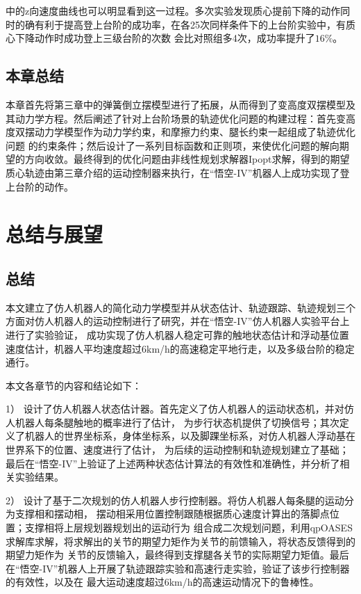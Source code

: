 中的z向速度曲线也可以明显看到这一过程。多次实验发现质心提前下降的动作同时的确有利于提高登上台阶的成功率，在各25次同样条件下的上台阶实验中，有质心下降动作时成功登上三级台阶的次数
会比对照组多4次，成功率提升了$16\%$。

\section{本章总结}
本章首先将第三章中的弹簧倒立摆模型进行了拓展，从而得到了变高度双摆模型及其动力学方程。然后阐述了针对上台阶场景的轨迹优化问题的构建过程：首先变高度双摆动力学模型作为动力学约束，和摩擦力约束、腿长约束一起组成了轨迹优化问题
的约束条件；然后设计了一系列目标函数和正则项，来使优化问题的解向期望的方向收敛。最终得到的优化问题由非线性规划求解器Ipopt求解，得到的期望质心轨迹由第三章介绍的运动控制器来执行，在“悟空-IV”机器人上成功实现了登上台阶的动作。
\chapter{总结与展望}
\section{总结}
本文建立了仿人机器人的简化动力学模型并从状态估计、轨迹跟踪、轨迹规划三个方面对仿人机器人的运动控制进行了研究，并在“悟空-IV”仿人机器人实验平台上进行了实验验证，
成功实现了仿人机器人稳定可靠的触地状态估计和浮动基位置速度估计，机器人平均速度超过6km/h的高速稳定平地行走，以及多级台阶的稳定通行。

本文各章节的内容和结论如下：

1） 设计了仿人机器人状态估计器。首先定义了仿人机器人的运动状态机，并对仿人机器人每条腿触地的概率进行了估计，
为步行状态机提供了切换信号；其次定义了机器人的世界坐标系，身体坐标系，以及脚踝坐标系，对仿人机器人浮动基在世界系下的位置、速度进行了估计，
为后续的运动控制和轨迹规划建立了基础；最后在“悟空-IV”上验证了上述两种状态估计算法的有效性和准确性，并分析了相关实验结果。

2） 设计了基于二次规划的仿人机器人步行控制器。将仿人机器人每条腿的运动分为支撑相和摆动相，
摆动相采用位置控制跟随根据质心速度计算出的落脚点位置；支撑相将上层规划器规划出的运动行为
组合成二次规划问题，利用qpOASES求解库求解，将求解出的关节的期望力矩作为关节的前馈输入，将状态反馈得到的期望力矩作为
关节的反馈输入，最终得到支撑腿各关节的实际期望力矩值。最后在“悟空-IV”机器人上开展了轨迹跟踪实验和高速行走实验，验证了该步行控制器的有效性，以及在
最大运动速度超过6km/h的高速运动情况下的鲁棒性。

